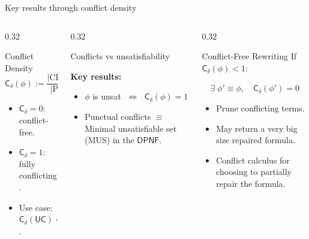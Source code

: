 \documentclass[9pt,aspectratio=169]{beamer}
\newcommand{\dpnf}{\ensuremath{\mathsf{DPNF}}}
\newcommand{\cd}{\ensuremath{\mathsf{C_\delta}}\xspace}
\newcommand{\UC}{\ensuremath{\mathsf{UC}}\xspace}
\begin{document}
\begin{frame}{Key results through conflict density}
\small
\begin{columns}[T]
  \begin{column}{0.32\textwidth}
  \begin{block}{Conflict Density}
    \[
    \cd(\phi) := \frac{|\text{CPT in } \dpnf(\phi)|}{|\text{PT in } \dpnf(\phi)|}
    \]
    \begin{itemize}\setlength\itemsep{2pt}
      \item $\cd = 0$: conflict-free.
      \item $\cd = 1$: fully conflicting.
      \item Use case: $\cd(\UC) = 75\%$.
    \end{itemize}
  \end{block}
\end{column}
\begin{column}{0.32\textwidth}
  \begin{block}{Conflicts vs unsatisfiability}
    \centering
    
    
    

    \raggedright
    \textbf{Key results:}
    \begin{itemize}\setlength\itemsep{2pt}
      \item $\phi$ is unsat $\;\Longleftrightarrow\;$ $\cd(\phi) = 1$
      \item Punctual conflicts $\equiv$ Minimal unsatisfiable set (MUS) in the \dpnf.
    \end{itemize}
  \end{block}
\end{column}

\begin{column}{0.32\textwidth}
  \begin{block}{Conflict-Free Rewriting}
    If $\cd(\phi) < 1$:
    
      $\quad \exists\;\phi' \equiv \phi,\quad \cd(\phi') = 0$
    
    \begin{itemize}\setlength\itemsep{2pt}
      \item Prune conflicting terms.
      \item May return a very big size repaired formula.
      \item Conflict calculus for choosing to partially repair the formula.
    \end{itemize}
  \end{block}
\end{column}
\end{columns}
\end{frame}
\end{document}
